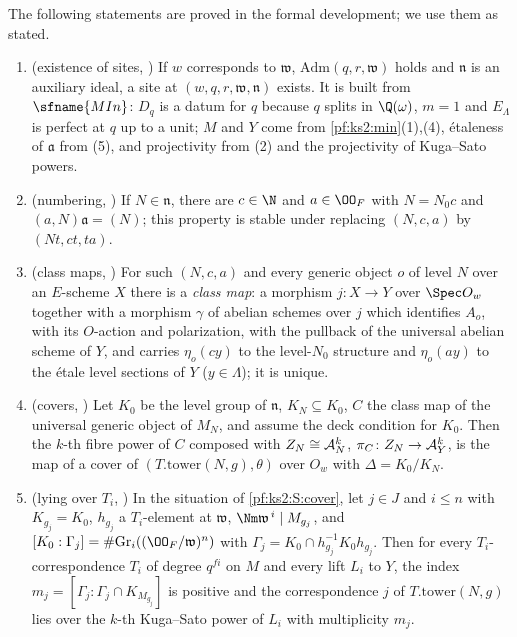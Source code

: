 The following statements are proved in the formal development; we use them as stated.
\begin{enumerate}[label=(S\arabic*)]
\item\label{pf:ks2:S:site} (existence of sites, )
  If $w$ corresponds to $\mathfrak w$, $\mathrm{Adm}(q,r,\mathfrak w)$ holds and $\mathfrak n$ is
  an auxiliary ideal, a site at
  $(w,q,r,\mathfrak w,\mathfrak n)$ exists. It is built from $\sfname{MIn}$: $D_q$ is a datum for $q$
  because $q$ splits in $\Q(\omega)$, $m=1$ and $E_\Lambda$ is perfect at $q$ up to a unit; $M$ and $Y$ come
  from \cref{pf:ks2:min}(1),(4), \'etaleness of $\mathfrak a$ from (5), and projectivity from (2)
  and the projectivity of Kuga--Sato powers.
\item\label{pf:ks2:S:num} (numbering, ) If
  $N\in\mathfrak n$, there are $c\in\N$ and $a\in\kstwoOF$ with $N=N_0c$ and
  $(a,N)\mathfrak a=(N)$; this property is stable under
  replacing $(N,c,a)$ by $(Nt,ct,ta)$.
\item\label{pf:ks2:S:cls} (class maps, ) For
  such $(N,c,a)$ and every generic object $o$ of level $N$ over an $E$-scheme $X$ there is a
  \emph{class map}: a morphism $j\colon X\to Y$ over $\Spec O_w$ together with a morphism $\gamma$ of
  abelian schemes over $j$ which identifies $A_o$, with its $O$-action and polarization, with the
  pullback of the universal abelian scheme of $Y$, and carries $\eta_o(cy)$ to the level-$N_0$
  structure and $\eta_o(ay)$ to the \'etale level sections of $Y$ ($y\in\Lambda$); it is unique.
\item\label{pf:ks2:S:cover} (covers, )
  Let $K_0$ be the level group of $\mathfrak n$, $K_N\subseteq K_0$, $C$ the class map of the
  universal generic object of $M_N$, and assume the deck condition for $K_0$. Then the $k$-th fibre
  power of $C$ composed with $Z_N\cong\mathcal{A}_N^k$, $\pi_C\colon Z_N\to\mathcal{A}_Y^k$, is the map of a
  cover of $(T.\mathrm{tower}(N,g),\theta)$ over $O_w$ with $\Delta=K_0/K_N$.
\item\label{pf:ks2:S:lies} (lying over $T_i$, )
  In the situation of \ref{pf:ks2:S:cover}, let $j\in J$ and $i\le n$ with $K_{g_j}=K_0$, $h_{g_j}$ a
  $T_i$-element at $\mathfrak w$, $\Nm\mathfrak w^{\,i}\mid M_{g_j}$, and $[K_0:\Gamma_j]=\#\mathrm{Gr}_i
  ((\kstwoOF/\mathfrak w)^n)$ with $\Gamma_j=K_0\cap h_{g_j}^{-1}K_0h_{g_j}$. Then for every
  $T_i$-correspondence $T_i$ of degree $q^{fi}$ on $M$ and every lift $L_i$ to $Y$, the index
  $m_j=[\Gamma_j:\Gamma_j\cap K_{M_{g_j}}]$ is positive and the correspondence $j$ of
  $T.\mathrm{tower}(N,g)$ lies over the $k$-th Kuga--Sato power of $L_i$ with multiplicity $m_j$.
\end{enumerate}

